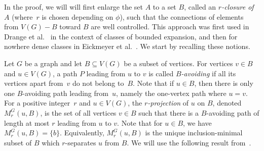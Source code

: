 %
In the proof, we will
will first enlarge the set $A$ to a set $B$, called
an \emph{$r$-closure of~$A$} (where~$r$ is chosen depending on $\phi$), such 
that the connections of elements from $V(G)-B$ 
toward $B$ are well controlled. This approach
was first used in Drange et al.~\cite{drange2016kernelization} in the context of classes of bounded expansion, 
and then for nowhere dense classes in Eickmeyer et al.~\cite{eickmeyer2016neighborhood}. 
We start by recalling these notions.

Let $G$ be a graph and let $B\subseteq V(G)$ be a subset of vertices. For vertices $v\in B$ and $u\in V(G)$, a path $P$ leading from $u$ to $v$ is called {\em{$B$-avoiding}}
if all its vertices apart from~$v$ do not belong to~$B$. Note that if $u\in B$, then there is only one $B$-avoiding path leading from~$u$, namely the one-vertex path where $u=v$.
For a positive integer~$r$ and $u\in V(G)$, the {\em{$r$-projection}} of $u$ on $B$, denoted $M^G_r(u,B)$, is the set of all vertices $v\in B$ such that there is
a $B$-avoiding path of length at most $r$ leading from $u$ to $v$. Note that for $u\in B$, we have $M^G_r(u,B)=\{b\}$.
Equivalently, $M^G_r(u,B)$ is the unique inclusion-minimal
subset of $B$ which $r$-separates $u$ from $B$.
%
%
We will use the following result from~\cite{eickmeyer2016neighborhood}.

